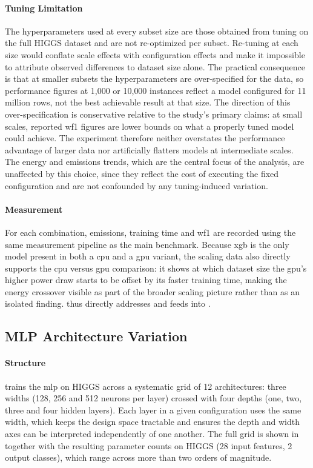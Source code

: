 \paragraph{Tuning Limitation}
The hyperparameters used at every subset size are those obtained from tuning on the full HIGGS dataset and are not re-optimized per subset. Re-tuning at each size would conflate scale effects with configuration effects and make it impossible to attribute observed differences to dataset size alone. The practical consequence is that at smaller subsets the hyperparameters are over-specified for the data, so performance figures at 1{,}000 or 10{,}000 instances reflect a model configured for 11 million rows, not the best achievable result at that size. The direction of this over-specification is conservative relative to the study's primary claims: at small scales, reported \gls{wf1} figures are lower bounds on what a properly tuned model could achieve. The experiment therefore neither overstates the performance advantage of larger data nor artificially flatters models at intermediate scales. The energy and emissions trends, which are the central focus of the analysis, are unaffected by this choice, since they reflect the cost of executing the fixed configuration and are not confounded by any tuning-induced variation.

\paragraph{Measurement}
For each combination, emissions, training time and \gls{wf1} are recorded using the same measurement pipeline as the main benchmark. Because \gls{xgb} is the only model present in both a \gls{cpu} and a \gls{gpu} variant, the scaling data also directly supports the \gls{cpu} versus \gls{gpu} comparison: it shows at which dataset size the \gls{gpu}'s higher power draw starts to be offset by its faster training time, making the energy crossover visible as part of the broader scaling picture rather than as an isolated finding.  thus directly addresses  and feeds into .

\subsection{MLP Architecture Variation}
\label{design_mlp_variation}\label{exp:3}

\paragraph{Structure}
 trains the \gls{mlp} on HIGGS across a systematic grid of 12 architectures: three widths (128, 256 and 512 neurons per layer) crossed with four depths (one, two, three and four hidden layers). Each layer in a given configuration uses the same width, which keeps the design space tractable and ensures the depth and width axes can be interpreted independently of one another. The full grid is shown in  together with the resulting parameter counts on HIGGS (28 input features, 2 output classes), which range across more than two orders of magnitude.

